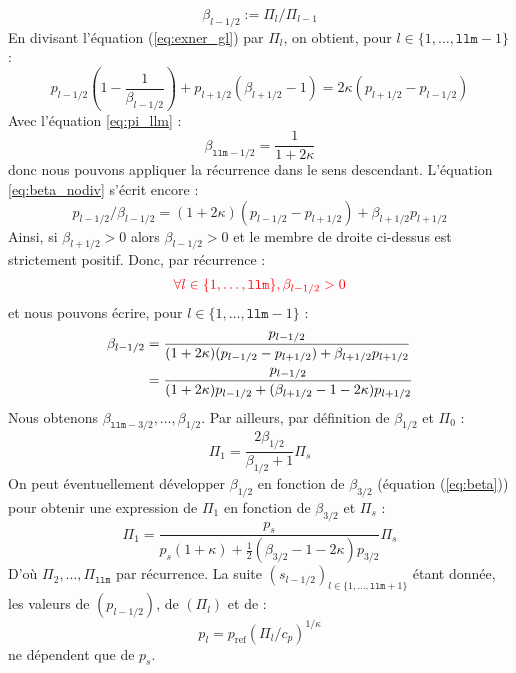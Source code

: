\documentclass[a4paper,french]{article}
\begin{document}
\begin{displaymath}
  \beta_{l-1/2} := \Pi_l / \Pi_{l-1}
\end{displaymath}
En divisant l'équation (\ref{eq:exner_gl}) par $\Pi_l$, on obtient,
pour $l \in \{1, \dots, \mathtt{llm} - 1\}$ :
\begin{equation}
  \label{eq:beta_nodiv}
  p_{l-1/2} \left( 1 - \frac{1}{\beta_{l-1/2}} \right) + p_{l+1/2} (\beta_{l+1/2} - 1)
  = 2 \kappa (p_{l+1/2} - p_{l-1/2})
\end{equation}
Avec l'équation \eqref{eq:pi_llm} :
\begin{displaymath}
  \beta_{\mathtt{llm}-1/2} = \frac{1}{1 + 2 \kappa}
\end{displaymath}
donc nous pouvons appliquer la récurrence dans le sens
descendant. L'équation \eqref{eq:beta_nodiv} s'écrit encore :
\begin{equation*}
  p_{l-1/2} / \beta_{l-1/2}
  = (1 + 2 \kappa) (p_{l-1/2} - p_{l+1/2}) + \beta_{l+1/2} p_{l+1/2}
\end{equation*}
Ainsi, si $\beta_{l+1/2} > 0$ alors $\beta_{l-1/2} > 0$ et le membre
de droite ci-dessus est strictement positif. Donc, par récurrence :
\begin{equation*}
  {\color{red}
    \forall l \in \{1, \dots, \mathtt{llm}\}, \beta_{l - 1 / 2} > 0
  }
\end{equation*}
et nous pouvons écrire, pour $l \in \{1, \dots, \mathtt{llm} - 1\}$ :
\begin{align}
  \notag
  \beta_{l-1/2}
  & =
  \frac{p_{l-1/2}}
  {(1 + 2 \kappa) (p_{l-1/2} - p_{l+1/2}) + \beta_{l+1/2} p_{l+1/2}} \\
  \label{eq:beta}
  & =
  \frac{p_{l-1/2}}{(1 + 2 \kappa) p_{l-1/2} + (\beta_{l+1/2} - 1 - 2 \kappa) p_{l+1/2}}
\end{align}
Nous obtenons $\beta_{\mathtt{llm}-3/2}, \dots, \beta_{1/2}$. Par
ailleurs, par définition de $\beta_{1/2}$ et $\Pi_0$ :
\begin{equation}
  \label{eq:pi1}
  \Pi_1 = \frac{2 \beta_{1/2}}{\beta_{1/2} + 1} \Pi_s
\end{equation}
On peut éventuellement développer $\beta_{1/2}$ en fonction de $\beta_{3/2}$
(équation (\ref{eq:beta})) pour obtenir une expression de $\Pi_1$ en
fonction de $\beta_{3/2}$ et $\Pi_s$ :
\begin{displaymath}
  \Pi_1
  =
  \frac{p_s}
  {p_s(1 + \kappa) + \frac{1}{2}(\beta_{3/2} - 1 - 2 \kappa) p_{3/2}} 
  \Pi_s
\end{displaymath}
D'où $\Pi_2, \dots, \Pi_\mathtt{llm}$ par récurrence. La suite
$(s_{l-1/2})_{l \in \{1, \dots, \mathtt{llm} + 1\}}$
étant donnée, les valeurs de $(p_{l-1/2})$, de $(\Pi_l)$ et de :
\begin{displaymath}
  p_l = p_\mathrm{ref} (\Pi_l / c_p)^{1 / \kappa}
\end{displaymath}
ne dépendent que de $p_s$.
\end{document}
